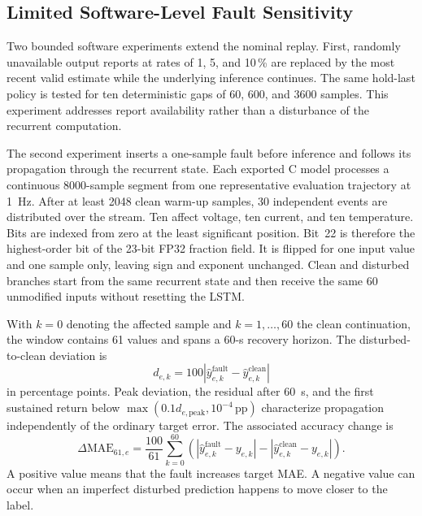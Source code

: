 \documentclass[
    a4paper,
    12pt,
    titlepage,
    bibliography=totoc,
    twoside=on,
    parskip=false,
    numbers=noenddot,
    cleardoublepage=empty,
    DIV=12,
    BCOR=12.0mm,
    headheight=36pt,
    headings=openright
]{scrreprt}
\begin{document}
\subsection{Limited Software-Level Fault Sensitivity}
Two bounded software experiments extend the nominal replay. First, randomly unavailable output reports at rates of 1, 5, and 10\,\% are replaced by the most recent valid estimate while the underlying inference continues. The same hold-last policy is tested for ten deterministic gaps of 60, 600, and 3600 samples. This experiment addresses report availability rather than a disturbance of the recurrent computation.

The second experiment inserts a one-sample fault before inference and follows its propagation through the recurrent state. Each exported C model processes a continuous 8000-sample segment from one representative evaluation trajectory at \SI{1}{\hertz}. After at least 2048 clean warm-up samples, 30 independent events are distributed over the stream. Ten affect voltage, ten current, and ten temperature. Bits are indexed from zero at the least significant position. Bit~22 is therefore the highest-order bit of the 23-bit FP32 fraction field. It is flipped for one input value and one sample only, leaving sign and exponent unchanged. Clean and disturbed branches start from the same recurrent state and then receive the same 60 unmodified inputs without resetting the LSTM.

With $k=0$ denoting the affected sample and $k=1,\ldots,60$ the clean continuation, the window contains 61 values and spans a 60-s recovery horizon. The disturbed-to-clean deviation is
\begin{equation}
    d_{e,k}=100\left|\hat y^{\mathrm{fault}}_{e,k}-\hat y^{\mathrm{clean}}_{e,k}\right|
\end{equation}
in percentage points. Peak deviation, the residual after 60~s, and the first sustained return below $\max(0.1d_{e,\mathrm{peak}},10^{-4}\,\mathrm{pp})$ characterize propagation independently of the ordinary target error. The associated accuracy change is
\begin{equation}
    \Delta\mathrm{MAE}_{61,e}
    =\frac{100}{61}\sum_{k=0}^{60}
    \left(
    \left|\hat y^{\mathrm{fault}}_{e,k}-y_{e,k}\right|
    -\left|\hat y^{\mathrm{clean}}_{e,k}-y_{e,k}\right|
    \right).
    \label{eq:embedded_fault_mae_change}
\end{equation}
A positive value means that the fault increases target MAE. A negative value can occur when an imperfect disturbed prediction happens to move closer to the label.
\end{document}
